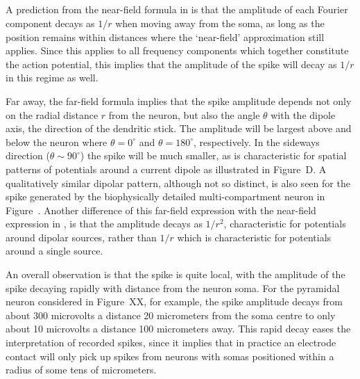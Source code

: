 
\subsection{}
A prediction from the near-field formula in  is that the amplitude of each Fourier component decays as $1/r$ when moving away from the soma, 
as long as the position remains within distances where the `near-field' approximation still applies.
Since this applies to all frequency components which together constitute the action potential, this implies that the amplitude of the 
spike will decay as $1/r$ in this regime as well. 

Far away, the far-field formula  implies that the spike amplitude depends not only on the radial distance $r$ from the neuron, but also the angle $\theta$ with the dipole axis, the direction of the dendritic stick. The amplitude will be largest above and below the neuron where $\theta=0^\circ$ and $\theta=180^\circ$, respectively. In the sideways direction 
($\theta \sim 90^\circ$) the spike will be much smaller, as is characteristic for spatial patterns of potentials around a current
dipole as illustrated in Figure~D. A qualitatively similar dipolar pattern, although not so distinct,
is also seen for the spike generated by the biophysically detailed multi-compartment neuron in 
Figure~.
Another difference of this far-field expression with the near-field expression in , is that the
amplitude decays as $1/r^2$, characteristic for potentials around dipolar sources, rather than $1/r$ which is characteristic for potentials around 
a single source. %

An overall observation is that the spike is quite local, with the amplitude of the spike decaying rapidly with distance from the neuron soma. 
For the pyramidal neuron considered in Figure~XX, for example, the spike amplitude decays from about
300 microvolts a distance 20 micrometers from the soma centre to only about 10 microvolts a
distance 100 micrometers away. 
This rapid decay eases the interpretation of recorded spikes, since it implies
that in practice an electrode contact will only pick up spikes from neurons with somas positioned within a radius of some tens of micrometers.

